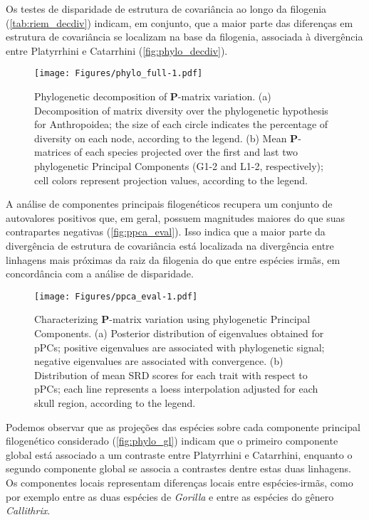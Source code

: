 \documentclass[12pt,twoside]{report}
\begin{document}
Os testes de disparidade de estrutura de covariância ao longo da
filogenia (\autoref{tab:riem_decdiv}) indicam, em conjunto, que a maior
parte das diferenças em estrutura de covariância se localizam na base da
filogenia, associada à divergência entre Platyrrhini e Catarrhini
(\autoref{fig:phylo_decdiv}).



\begin{figure}[htbp]
\centering
\texttt{[image: Figures/phylo\_full-1.pdf]}
\caption{Phylogenetic decomposition of $\mathbf{P}$-matrix variation.
(a) Decomposition of matrix diversity over the phylogenetic hypothesis
for Anthropoidea; the size of each circle indicates the percentage of
diversity on each node, according to the legend. (b) Mean
$\mathbf{P}$-matrices of each species projected over the first and last
two phylogenetic Principal Components (G1-2 and L1-2, respectively);
cell colors represent projection values, according to the legend.
\label{fig:phylo_full}}
\end{figure}

A análise de componentes principais filogenéticos recupera um conjunto
de autovalores positivos que, em geral, possuem magnitudes maiores do
que suas contrapartes negativas (\autoref{fig:ppca_eval}). Isso indica
que a maior parte da divergência de estrutura de covariância está
localizada na divergência entre linhagens mais próximas da raiz da
filogenia do que entre espécies irmãs, em concordância com a análise de
disparidade.

\begin{figure}[htbp]
\centering
\texttt{[image: Figures/ppca\_eval-1.pdf]}
\caption{Characterizing $\mathbf{P}$-matrix variation using phylogenetic
Principal Components. (a) Posterior distribution of eigenvalues obtained
for pPCs; positive eigenvalues are associated with phylogenetic signal;
negative eigenvalues are associated with convergence. (b) Distribution
of mean SRD scores for each trait with respect to pPCs; each line
represents a loess interpolation adjusted for each skull region,
according to the legend. \label{fig:ppca_eval}}
\end{figure}

Podemos observar que as projeções das espécies sobre cada componente
principal filogenético considerado (\autoref{fig:phylo_gl}) indicam que
o primeiro componente global está associado a um contraste entre
Platyrrhini e Catarrhini, enquanto o segundo componente global se
associa a contrastes dentre estas duas linhagens. Os componentes locais
representam diferenças locais entre espécies-irmãs, como por exemplo
entre as duas espécies de \emph{Gorilla} e entre as espécies do gênero
\emph{Callithrix}.
\end{document}
